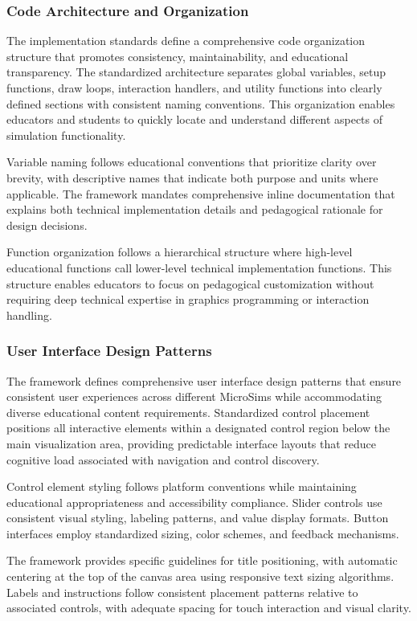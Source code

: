\subsubsection{Code Architecture and Organization}

The implementation standards define a comprehensive code organization structure that promotes consistency, maintainability, and educational transparency. The standardized architecture separates global variables, setup functions, draw loops, interaction handlers, and utility functions into clearly defined sections with consistent naming conventions. This organization enables educators and students to quickly locate and understand different aspects of simulation functionality.

Variable naming follows educational conventions that prioritize clarity over brevity, with descriptive names that indicate both purpose and units where applicable. The framework mandates comprehensive inline documentation that explains both technical implementation details and pedagogical rationale for design decisions.

Function organization follows a hierarchical structure where high-level educational functions call lower-level technical implementation functions. This structure enables educators to focus on pedagogical customization without requiring deep technical expertise in graphics programming or interaction handling.

\subsubsection{User Interface Design Patterns}

The framework defines comprehensive user interface design patterns that ensure consistent user experiences across different MicroSims while accommodating diverse educational content requirements. Standardized control placement positions all interactive elements within a designated control region below the main visualization area, providing predictable interface layouts that reduce cognitive load associated with navigation and control discovery.

Control element styling follows platform conventions while maintaining educational appropriateness and accessibility compliance. Slider controls use consistent visual styling, labeling patterns, and value display formats. Button interfaces employ standardized sizing, color schemes, and feedback mechanisms.

The framework provides specific guidelines for title positioning, with automatic centering at the top of the canvas area using responsive text sizing algorithms. Labels and instructions follow consistent placement patterns relative to associated controls, with adequate spacing for touch interaction and visual clarity.

